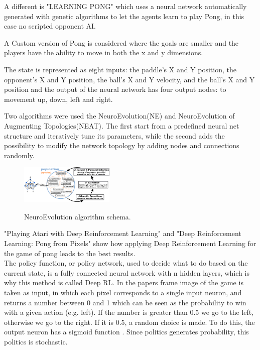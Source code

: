 A different is "LEARNING PONG" which uses a neural network automatically generated with genetic algorithms to let the agents learn to play Pong, in this case no scripted opponent AI.

A Custom version of Pong is considered where the goals are smaller and the players have the ability to move in both the x and y dimensions.

The state is represented as eight inputs: the paddle's X and Y position, the opponent's X and Y position, the ball's X and Y velocity,
and the ball's X and Y position and the output of the neural network has four output nodes: to movement up, down, left and right.

Two algorithms were used the NeuroEvolution(NE) and NeuroEvolution of Augmenting Topologies(NEAT).
The first start from a predefined neural net structure and iteratively tune its parameters, while the second adds the possibility to modify the network topology by adding nodes and connections randomly.



\begin{figure}[ht]
    \centering
    \includegraphics[width=0.4\textwidth]{images/neuroevolution.png}
    \label{ne}
    \caption{NeuroEvolution algorithm schema.}
\end{figure}

"Playing Atari with Deep Reinforcement Learning" \cite{mnih2013playing} and "Deep Reinforcement Learning: Pong from Pixels" \cite{karpathy2016deep} show how applying Deep Reinforcement Learning for the game of pong leads to the best results.\\

The policy function, or policy network, used to decide what to do based on the current state, is a fully connected neural network with n hidden layers, which is why this method is called Deep RL. In the papers frame image of the game is taken as input, in which each pixel corresponds to a single input neuron, and returns a number between 0 and 1 which can be seen as the probability to win with a given action (e.g. left). If the number is greater than 0.5 we go to the left, otherwise we go to the right. If it is 0.5, a random choice is made. To do this, the output neuron has a sigmoid function \cite{mnih2013playing}\cite{karpathy2016deep}.
Since politics generates probability, this politics is stochastic.

